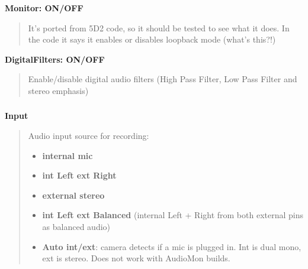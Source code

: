 \documentclass[a4paper,english]{article}
\begin{document}
\textbf{Monitor: ON/OFF}
%
\begin{quote}

It's ported from 5D2 code, so it should be tested to see what it does. In the code it says it enables or disables loopback mode (what's this?!)

\end{quote}

\textbf{DigitalFilters: ON/OFF}
%
\begin{quote}

Enable/disable digital audio filters (High Pass Filter, Low Pass Filter and stereo emphasis)

\end{quote}
\vspace{-10mm}\subsubsection*{}\label{input-source}
\textbf{Input}
%
\begin{quote}

Audio input source for recording:
%
\begin{itemize}

\item \textbf{internal mic}

\item \textbf{int Left ext Right}

\item \textbf{external stereo}

\item \textbf{int Left ext Balanced} (internal Left + Right from both external pins as balanced audio)

\item \textbf{Auto int/ext}: camera detects if a mic is plugged in. Int is dual mono, ext is stereo. Does not work with AudioMon builds.

\end{itemize}

\end{quote}
\vspace{-10mm}\subsubsection*{}\label{balanced}\begin{figure}
\noindent{}
\end{figure}
\end{document}

